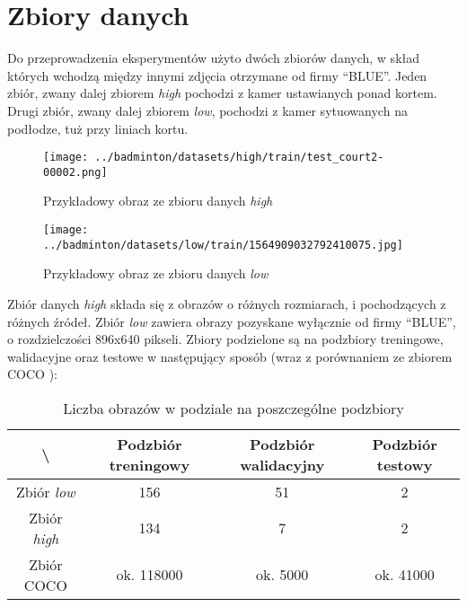 \newpage
\section{Zbiory danych}

Do przeprowadzenia eksperymentów użyto dwóch zbiorów danych, w skład których wchodzą między innymi zdjęcia otrzymane od firmy ``BLUE''.
Jeden zbiór, zwany dalej zbiorem \textit{high} pochodzi z kamer ustawianych ponad kortem.
Drugi zbiór, zwany dalej zbiorem \textit{low}, pochodzi z kamer sytuowanych na podłodze, tuż przy liniach kortu.


\begin{figure}[!htb]
    \texttt{[image: ../badminton/datasets/high/train/test\_court2-00002.png]}
    \caption{Przykładowy obraz ze zbioru danych \textit{high}}
  \endminipage\hfill
    \texttt{[image: ../badminton/datasets/low/train/1564909032792410075.jpg]}
    \caption{Przykładowy obraz ze zbioru danych \textit{low}}
  \endminipage\hfill
\end{figure}

Zbiór danych \textit{high} składa się z obrazów o różnych rozmiarach, i pochodzących z różnych źródeł.
Zbiór \textit{low} zawiera obrazy pozyskane wyłącznie od firmy ``BLUE'', o rozdzielczości 896x640 pikseli.
Zbiory podzielone są na podzbiory treningowe, walidacyjne oraz testowe w następujący sposób (wraz z porównaniem ze zbiorem COCO \cite{coco}):

\begin{table}[!h]
	\centering
	\caption{Liczba obrazów w podziale na poszczególne podzbiory}
	\vspace{6pt}
	{\footnotesize
		\begin{tabular}{|c|c|c|c|}
			\hline \textbackslash & Podzbiór treningowy & Podzbiór walidacyjny & Podzbiór testowy \\
      \hline Zbiór \textit{low} & 156 & 51 & 2 \\
      \hline Zbiór \textit{high} & 134 & 7 & 2 \\
      \hline Zbiór COCO & ok. 118000 & ok. 5000 & ok. 41000 \\
      \hline
		\end{tabular}
	}
	\vspace{0pt}
\end{table}

